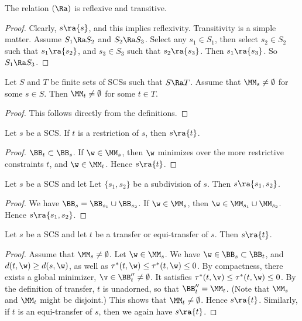 \begin{lemma}
The relation $(\Ra)$  is reflexive and transitive.
\end{lemma}

\begin{proof}  Clearly, $s\ra \{s\}$, and this implies reflexivity.
Transitivity is a simple matter.  Assume
$S_1\Ra S_2$ and $S_2\Ra S_3$.  Select any $s_1\in S_1$, then select
$s_2\in S_2$ such that $s_1\ra \{s_2\}$, and $s_3\in S_3$ such
that $s_2\ra \{s_3\}$.  Then $s_1\ra\{s_3\}$.  So $S_1\Ra S_3$.
\end{proof}

\begin{lemma}\label{lemma:propagate}
Let $S$  and $T$ be finite sets of SCSs such that
$S\Ra T$.  Assume that $\MM_s\ne\emptyset$ for some $s\in S$.
Then $\MM_t\ne\emptyset$ for some $t\in T$.
\end{lemma}

\begin{proof} This follows directly from the definitions. 
\end{proof}

\begin{lemma}[restriction]
Let $s$ be a SCS.
If $t$ is a restriction of $s$, then $s\ra \{t\}$.
\end{lemma}

\begin{proof}
$\BB_t\subset \BB_s$.
If $\w\in \MM_s$, then $\w$ minimizes over the more restrictive
constraints $t$, and $\w\in \MM_t$.  Hence $s\ra\{t\}$.
\end{proof}


\begin{lemma}[subdivision]
Let $s$ be a SCS and let
Let $\{s_1,s_2\}$ be a subdivision of $s$.  
Then $s\ra\{s_1,s_2\}$.
\end{lemma}

\begin{proof}
We have $\BB_s =
\BB_{s_1}\cup \BB_{s_2}$.  If $\w\in \MM_s$, then
$\w\in \MM_{s_1}\cup\MM_{s_2}$.
  Hence $s\ra\{s_1,s_2\}$.
\end{proof}

\begin{lemma}  
Let $s$ be a SCS and let
 $t$ be a transfer or equi-transfer of $s$.  
Then  $s\ra\{t\}$.
\end{lemma}

\begin{proof}
Assume that $\MM_s\ne\emptyset$.
Let $\w\in \MM_s$.
We have $\w\in \BB_s\subset\BB_t$, and $d(t,\w) \ge d(s,\w)$,
as well as $\tau^*(t,\w)\le\tau^*(t,\w)\le 0$.   By compactness, there
exists a global minimizer,
$\v\in\BB''_t\ne\emptyset$.  It satisfies
$\tau^*(t,\v)\le\tau^*(t,\w)\le 0$.  By the definition of transfer,
$t$
is unadorned, so that $\BB''_t=\MM_t$.  (Note that $\MM_s$ and
$\MM_t$
might be disjoint.)  This shows that
$\MM_t\ne\emptyset$.
Hence $s\ra\{t\}$.  Similarly, if $t$ is an equi-transfer of $s$,
then we again have $s\ra\{t\}$.
\end{proof}

